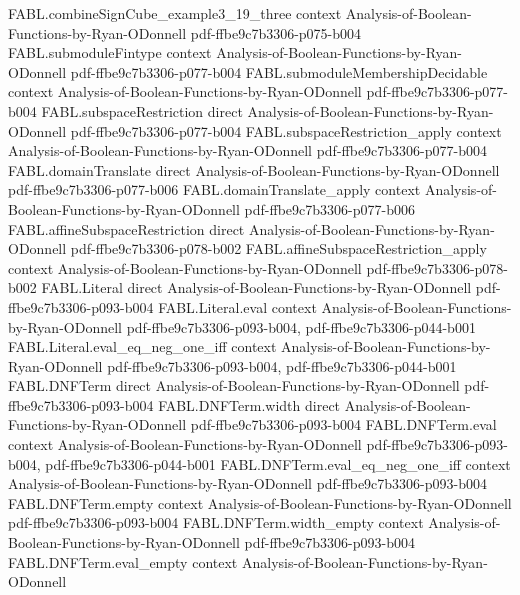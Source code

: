 \begin{theorem}
\proofstep
  {FABL.combineSignCube_example3_19_three}
  {context}
  {Analysis-of-Boolean-Functions-by-Ryan-ODonnell}
  {pdf-ffbe9c7b3306-p075-b004}
\proofstep
  {FABL.submoduleFintype}
  {context}
  {Analysis-of-Boolean-Functions-by-Ryan-ODonnell}
  {pdf-ffbe9c7b3306-p077-b004}
\proofstep
  {FABL.submoduleMembershipDecidable}
  {context}
  {Analysis-of-Boolean-Functions-by-Ryan-ODonnell}
  {pdf-ffbe9c7b3306-p077-b004}
\proofstep
  {FABL.subspaceRestriction}
  {direct}
  {Analysis-of-Boolean-Functions-by-Ryan-ODonnell}
  {pdf-ffbe9c7b3306-p077-b004}
\proofstep
  {FABL.subspaceRestriction_apply}
  {context}
  {Analysis-of-Boolean-Functions-by-Ryan-ODonnell}
  {pdf-ffbe9c7b3306-p077-b004}
\proofstep
  {FABL.domainTranslate}
  {direct}
  {Analysis-of-Boolean-Functions-by-Ryan-ODonnell}
  {pdf-ffbe9c7b3306-p077-b006}
\proofstep
  {FABL.domainTranslate_apply}
  {context}
  {Analysis-of-Boolean-Functions-by-Ryan-ODonnell}
  {pdf-ffbe9c7b3306-p077-b006}
\proofstep
  {FABL.affineSubspaceRestriction}
  {direct}
  {Analysis-of-Boolean-Functions-by-Ryan-ODonnell}
  {pdf-ffbe9c7b3306-p078-b002}
\proofstep
  {FABL.affineSubspaceRestriction_apply}
  {context}
  {Analysis-of-Boolean-Functions-by-Ryan-ODonnell}
  {pdf-ffbe9c7b3306-p078-b002}
\proofstep
  {FABL.Literal}
  {direct}
  {Analysis-of-Boolean-Functions-by-Ryan-ODonnell}
  {pdf-ffbe9c7b3306-p093-b004}
\proofstep
  {FABL.Literal.eval}
  {context}
  {Analysis-of-Boolean-Functions-by-Ryan-ODonnell}
  {pdf-ffbe9c7b3306-p093-b004,
    pdf-ffbe9c7b3306-p044-b001}
\proofstep
  {FABL.Literal.eval_eq_neg_one_iff}
  {context}
  {Analysis-of-Boolean-Functions-by-Ryan-ODonnell}
  {pdf-ffbe9c7b3306-p093-b004,
    pdf-ffbe9c7b3306-p044-b001}
\proofstep
  {FABL.DNFTerm}
  {direct}
  {Analysis-of-Boolean-Functions-by-Ryan-ODonnell}
  {pdf-ffbe9c7b3306-p093-b004}
\proofstep
  {FABL.DNFTerm.width}
  {direct}
  {Analysis-of-Boolean-Functions-by-Ryan-ODonnell}
  {pdf-ffbe9c7b3306-p093-b004}
\proofstep
  {FABL.DNFTerm.eval}
  {context}
  {Analysis-of-Boolean-Functions-by-Ryan-ODonnell}
  {pdf-ffbe9c7b3306-p093-b004,
    pdf-ffbe9c7b3306-p044-b001}
\proofstep
  {FABL.DNFTerm.eval_eq_neg_one_iff}
  {context}
  {Analysis-of-Boolean-Functions-by-Ryan-ODonnell}
  {pdf-ffbe9c7b3306-p093-b004}
\proofstep
  {FABL.DNFTerm.empty}
  {context}
  {Analysis-of-Boolean-Functions-by-Ryan-ODonnell}
  {pdf-ffbe9c7b3306-p093-b004}
\proofstep
  {FABL.DNFTerm.width_empty}
  {context}
  {Analysis-of-Boolean-Functions-by-Ryan-ODonnell}
  {pdf-ffbe9c7b3306-p093-b004}
\proofstep
  {FABL.DNFTerm.eval_empty}
  {context}
  {Analysis-of-Boolean-Functions-by-Ryan-ODonnell}

\end{theorem}
